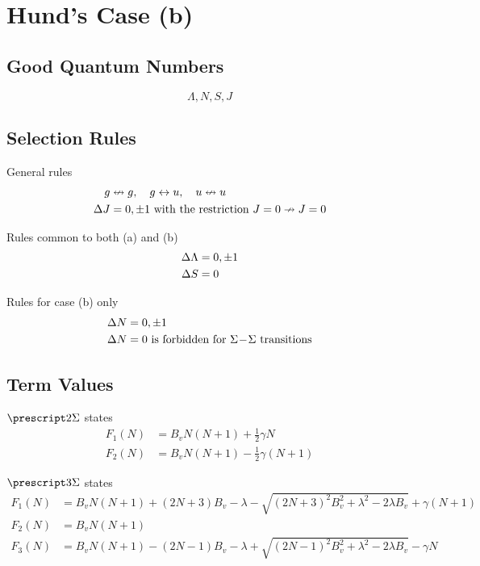 \section{Hund's Case (b)}
\label{s:hunds_case_b}

\subsection{Good Quantum Numbers}

\begin{equation*}
    \Lambda, N, S, J
\end{equation*}

\subsection{Selection Rules}

General rules
\begin{align*}
    g        &\nleftrightarrow g, \quad g \leftrightarrow u, \quad u \nleftrightarrow u \\
    \adif{J} &= 0, \pm 1 \text{ with the restriction } J = 0 \nrightarrow J = 0
\end{align*}

Rules common to both (a) and (b)
\begin{align*}
    \adif{\Lambda} &= 0, \pm 1 \\
    \adif{S}       &= 0
\end{align*}

Rules for case (b) only
\begin{align*}
    \adif{N} &= 0, \pm 1 \\
    \adif{N} &= 0 \text{ is forbidden for } \Sigma\dash\Sigma \text{ transitions}
\end{align*}

\subsection{Term Values}

$\state{2}{\Sigma}$ states
\begin{align*}
    F_1(N) &= B_vN(N + 1) + \tfrac{1}{2}\gamma N \\
    F_2(N) &= B_vN(N + 1) - \tfrac{1}{2}\gamma(N + 1)
\end{align*}

$\state{3}{\Sigma}$ states
\begin{align*}
    F_1(N) &= B_vN(N + 1) + (2N + 3)B_v - \lambda - \sqrt{(2N + 3)^2B_v^2 + \lambda^2 - 2\lambda B_v} + \gamma(N + 1) \\
    F_2(N) &= B_vN(N + 1)                                                                                             \\
    F_3(N) &= B_vN(N + 1) - (2N - 1)B_v - \lambda + \sqrt{(2N - 1)^2B_v^2 + \lambda^2 - 2\lambda B_v} - \gamma N
\end{align*}

